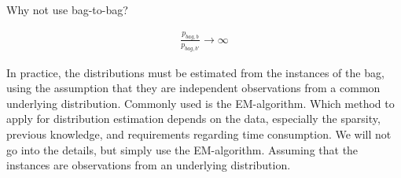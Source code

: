 Why not use bag-to-bag?

\begin{align}
  \frac{p_{bag,b}}{p_{bag,b'}} \rightarrow \infty
\end{align}


In practice, the distributions must be estimated from the instances of the bag, using the assumption that they are independent observations from a common underlying distribution. 
Commonly used is the EM-algorithm.
Which method to apply for distribution estimation depends on the data, especially the sparsity, previous knowledge, and requirements regarding time consumption. 
We will not go into the details, but simply use the EM-algorithm.
Assuming that the instances are observations from an underlying distribution. 


